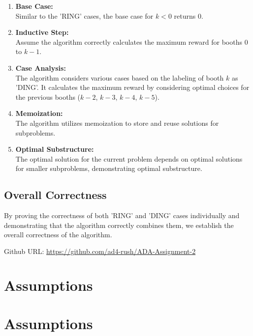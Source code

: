 \documentclass{article}
\begin{document}
\begin{enumerate}
    \item \textbf{Base Case:} \\
        Similar to the 'RING' cases, the base case for \(k < 0\) returns 0.
        
    \item \textbf{Inductive Step:} \\
        Assume the algorithm correctly calculates the maximum reward for booths \(0\) to \(k-1\).
        
    \item \textbf{Case Analysis:} \\
        The algorithm considers various cases based on the labeling of booth \(k\) as 'DING'. It calculates the maximum reward by considering optimal choices for the previous booths (\(k-2\), \(k-3\), \(k-4\), \(k-5\)).
        
    \item \textbf{Memoization:} \\
        The algorithm utilizes memoization to store and reuse solutions for subproblems.
        
    \item \textbf{Optimal Substructure:} \\
        The optimal solution for the current problem depends on optimal solutions for smaller subproblems, demonstrating optimal substructure.
\end{enumerate}

\subsection{Overall Correctness}

By proving the correctness of both 'RING' and 'DING' cases individually and demonstrating that the algorithm correctly combines them, we establish the overall correctness of the algorithm.


Github URL: \url{https://github.com/ad4-rush/ADA-Assignment-2}

\section{Assumptions}

\section{Assumptions}
\end{document}
